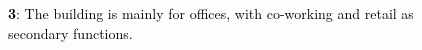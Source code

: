 ﻿%
\begin{figure}[H]
	\centering
	
	\vspace*{\baselineskip}%
	\caption*{%
		\footnotesize
		\textcolor{black}{%
			\textnormal{%
				\textbf{3}:
				The building is mainly for offices, with co-working and retail as secondary functions.
			}
		}
	}
	\label{
		fig:algae-bio-facade-system--features-03
	}
\end{figure}
